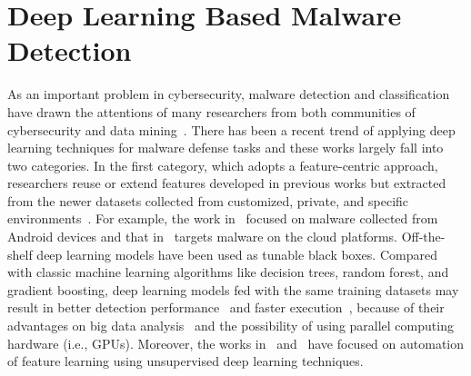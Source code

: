 

\section{Deep Learning Based Malware Detection}

As an important problem in cybersecurity, malware detection and classification have drawn the attentions of many researchers from both communities of cybersecurity and data mining~\cite{MalDetectSurvey1, MalDetectSurvey2}.
There has been a recent trend of applying deep learning techniques for malware defense tasks and these works largely fall into two categories.
In the first category, which adopts a feature-centric approach, researchers reuse or extend features developed in previous works but extracted from the newer datasets collected from customized, private, and specific environments~\cite{EarlyStageRnn, DeepFlow, DeepAM, RandomProjectionNn, AutoEncoderFeatureLearn, AutoEncoderMicrosoft, LstmSyscall, MalwareLstmGru}.
For example, the work in~\cite{DeepFlow} focused on malware collected from Android devices and that in~\cite{DeepAM} targets malware on the cloud platforms.
Off-the-shelf deep learning models have been used as tunable black boxes.
Compared with classic machine learning algorithms like decision trees, random forest, and gradient boosting,
deep learning models fed with the same training datasets may result in better detection performance~\cite{DeepFlow,RandomProjectionNn} and faster execution~\cite{EarlyStageRnn},
because of their advantages on big data analysis~\cite{RandomProjectionNn} and the possibility of using parallel computing hardware (i.e., GPUs).
Moreover, the works in~\cite{AutoEncoderFeatureLearn} and~\cite{AutoEncoderMicrosoft} have focused on automation of feature learning using unsupervised deep learning techniques.

